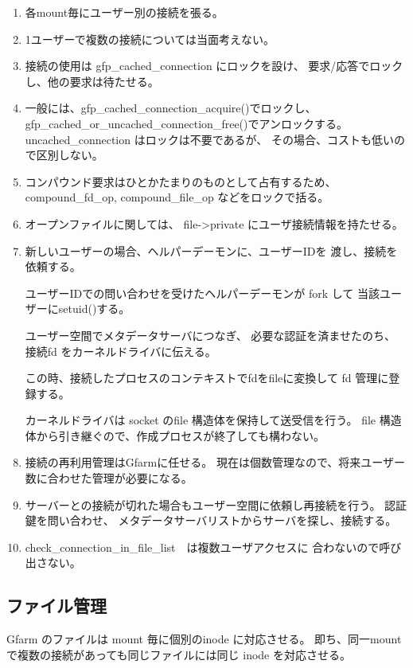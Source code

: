 	\begin{enumerate}
	\item	各mount毎にユーザー別の接続を張る。
	\item	1ユーザーで複数の接続については当面考えない。
	\item	接続の使用は gfp_cached_connection にロックを設け、
		要求/応答でロックし、他の要求は待たせる。
	\item	一般には、gfp_cached_connection_acquire()でロックし、
		gfp_cached_or_uncached_connection_free()でアンロックする。
		uncached_connection はロックは不要であるが、
		その場合、コストも低いので区別しない。
	\item	コンパウンド要求はひとかたまりのものとして占有するため、
		compound_fd_op, compound_file_op などをロックで括る。
	\item	オープンファイルに関しては、
		file->private にユーザ接続情報を持たせる。
	\item	新しいユーザーの場合、ヘルパーデーモンに、ユーザーIDを
		渡し、接続を依頼する。

		ユーザーIDでの問い合わせを受けたヘルパーデーモンが
		fork して 当該ユーザーにsetuid()する。

		ユーザー空間でメタデータサーバにつなぎ、
		必要な認証を済ませたのち、
		接続fd をカーネルドライバに伝える。

		この時、接続したプロセスのコンテキストでfdをfileに変換して
		fd 管理に登録する。

		カーネルドライバは socket のfile 構造体を保持して送受信を行う。
		file 構造体から引き継ぐので、作成プロセスが終了しても構わない。

	\item	接続の再利用管理はGfarmに任せる。
		現在は個数管理なので、将来ユーザー数に合わせた管理が必要になる。

	\item	サーバーとの接続が切れた場合もユーザー空間に依頼し再接続を行う。
		認証鍵を問い合わせ、
		メタデータサーバリストからサーバを探し、接続する。

	\item	check_connection_in_file_list　は複数ユーザアクセスに
		合わないので呼び出さない。
	\end{enumerate}

\subsection{ファイル管理}
	Gfarm のファイルは mount 毎に個別のinode に対応させる。
	即ち、同一mount で複数の接続があっても同じファイルには同じ inode
	を対応させる。

